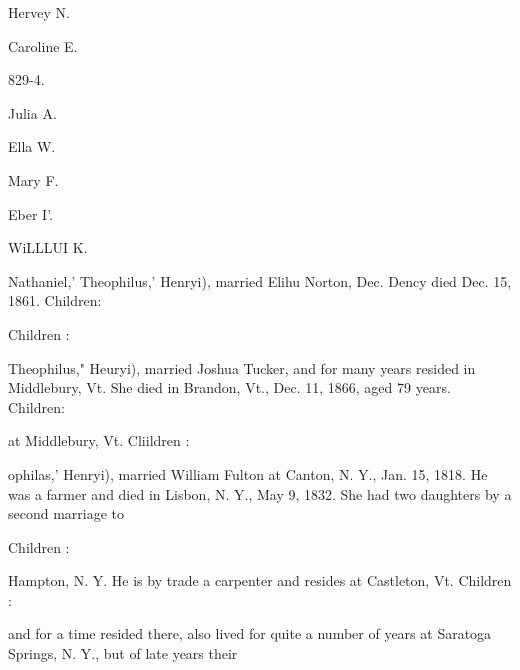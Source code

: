 \documentclass{book}
\begin{document}
Hervey N. 




Caroline E. 


829-4. 


Julia A. 




Ella W. 




Mary F. 




Eber I'. 




WiLLLUI K. 



Nathaniel,' Theophilus,' Henryi), married Elihu Norton, Dec. 
Dency died Dec. 15, 1861. Children: 


















Children : 




Theophilus," Heuryi), married Joshua Tucker, and for many 
years resided in Middlebury, Vt. She died in Brandon, Vt., 
Dec. 11, 1866, aged 79 years. Children: 










at Middlebury, Vt. Cliildren : 







ophilas,' Henryi), married William Fulton at Canton, N. Y., 
Jan. 15, 1818. He was a farmer and died in Lisbon, N. Y., 
May 9, 1832. She had two daughters by a second marriage to 

Children : 











Hampton, N. Y. He is by trade a carpenter and resides at 
Castleton, Vt. Children : 





and for a time resided there, also lived for quite a number of 
years at Saratoga Springs, N. Y., but of late years their 
\end{document}

